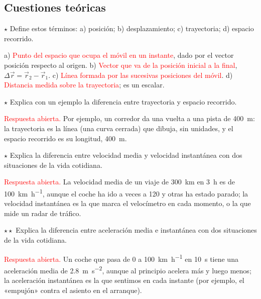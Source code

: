 \subsection{Cuestiones teóricas}

\begin{exercise}
    \(\star\) Define estos términos: a) posición; b) desplazamiento; c) trayectoria; d) espacio recorrido.
    \begin{solu}
        a) \textcolor{red}{Punto del espacio que ocupa el móvil en un instante}, dado por el vector posición respecto al origen.
        b) \textcolor{red}{Vector que va de la posición inicial a la final}, \(\Delta\vec r = \vec r_2 - \vec r_1\).
        c) \textcolor{red}{Línea formada por las sucesivas posiciones del móvil}. d) \textcolor{red}{Distancia medida sobre la
        trayectoria}; es un escalar.
    \end{solu}
\end{exercise}

\begin{exercise}
    \(\star\) Explica con un ejemplo la diferencia entre trayectoria y espacio recorrido.
    \begin{solu}
        \textcolor{red}{Respuesta abierta.} Por ejemplo, un corredor da una vuelta a una pista de \qty{400}{\m}: la trayectoria es
        la línea (una curva cerrada) que dibuja, sin unidades, y el espacio recorrido es su longitud, \qty{400}{\m}.
    \end{solu}
\end{exercise}

\begin{exercise}
    \(\star\) Explica la diferencia entre velocidad media y velocidad instantánea con dos situaciones de la vida cotidiana.
    \begin{solu}
        \textcolor{red}{Respuesta abierta.} La velocidad media de un viaje de \qty{300}{\km} en \qty{3}{\hour} es de
        \qty{100}{\km\per\hour}, aunque el coche ha ido a veces a 120 y otras ha estado parado; la velocidad instantánea es la que
        marca el velocímetro en cada momento, o la que mide un radar de tráfico.
    \end{solu}
\end{exercise}

\begin{exercise}
    \(\star\star\) Explica la diferencia entre aceleración media e instantánea con dos situaciones de la vida cotidiana.
    \begin{solu}
        \textcolor{red}{Respuesta abierta.} Un coche que pasa de 0 a \qty{100}{\km\per\hour} en \qty{10}{\s} tiene una aceleración
        media de \qty{2.8}{\m\per\s\squared}, aunque al principio acelera más y luego menos; la aceleración instantánea es la que
        sentimos en cada instante (por ejemplo, el «empujón» contra el asiento en el arranque).
    \end{solu}
\end{exercise}

